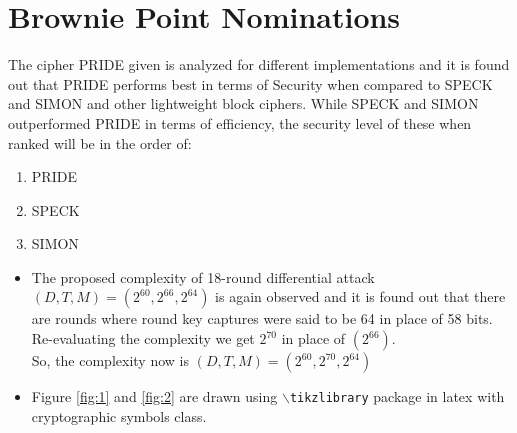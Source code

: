 \section{Brownie Point Nominations}
\begin{frame}{}
    \begin{block}{}
    The cipher PRIDE given is analyzed for different implementations and it is found out that PRIDE performs best in terms of Security when compared to SPECK and SIMON and other lightweight block ciphers. While SPECK and SIMON outperformed PRIDE in terms of efficiency, the security level of these when ranked will be in the order of:
		\begin{enumerate}
			\item PRIDE
			\item SPECK
			\item SIMON
		\end{enumerate}
	\end{block}
\end{frame}

\begin{frame}{}
\begin{block}{}
    \begin{itemize}
        \item The proposed complexity of 18-round differential attack $ (D,T,M) = (2^{60},2^{66},2^{64}) $ is again observed and it is found out that there are rounds where round key captures were said to be 64 in place of 58 bits. Re-evaluating the complexity we get $2^{70}$ in place of $(2^{66})$.\\
		So, the complexity now is $ (D,T,M) = (2^{60},2^{70},2^{64}) $
		
		\item Figure \ref{fig:1} and \ref{fig:2} are drawn using \texttt{$\backslash$tikzlibrary} package in latex with cryptographic symbols class.
		 \end{itemize}
		\end{block}
\end{frame}


